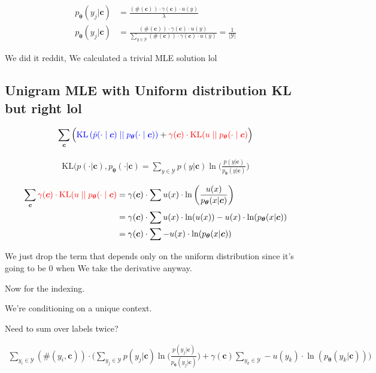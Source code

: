 \documentclass{article}
\newcommand{\KL}{\mathrm{KL}}
\newcommand{\uniform}{u}
\newcommand{\vtheta}{\boldsymbol{\theta}}
\newcommand{\model}{p_{\vtheta}}
\newcommand{\context}{\boldsymbol{c}}
\begin{document}
			\begin{align}
				\model(y_j|\context)  &= \frac{(\#(\context))\cdot \gamma(\context)\cdot u(y)}{\lambda}\\
				\model(y_j|\context)  &= \frac{(\#(\context))\cdot \gamma(\context)\cdot u(y)}{\sum_{y\in\mathcal{Y}} (\#(\context))\cdot \gamma(\context)\cdot u(y)} = \frac{1}{|\mathcal{Y}|}
			\end{align}
			
			We did it reddit, We calculated a trivial MLE solution lol
			
	\subsection{Unigram MLE with Uniform distribution KL but right lol}
	
		\begin{align}
	  		\sum_{\context} \Big( {\color{blue} \KL\left(\tilde{p}(\cdot 			\mid \context) \mid\mid \model(\cdot \mid \context)					\right)} + {\color{red}\gamma(\context) \cdot 						\KL(\uniform \mid\mid \model(\cdot \mid \context)}\Big)
		\end{align}
		
		\begin{align}
			\KL(p(\cdot|\context), \model(\cdot|\context) = \sum_{y\in\mathcal{Y}} p(y|\context)\ln\bigg(\frac{p(y|\context)}{\model(y|\context)} \bigg)
		\end{align}
		
		\begin{align}
			\sum_{\context} {\color{red}\gamma(\context) \cdot 						\KL(\uniform \mid\mid \model(\cdot \mid \context)} &= \gamma(\context)\cdot\sum u(x)\cdot \ln\bigg(\frac{u(x)}{\model(x|\context)}\bigg)\\
		&= \gamma(\context)\cdot\sum u(x)\cdot\ln(u(x)) - u(x)\cdot\ln(\model(x|\context))\\
		&= \gamma(\context)\cdot\sum - u(x)\cdot\ln(\model(x|\context))
		\end{align}
		
		We just drop the term that depends only on the uniform distribution since it's going to be 0 when We take the derivative anyway.
		
		Now for the indexing. 
		
		We're conditioning on a unique context.
		
		Need to sum over labels twice?
		
		\begin{align}
			\sum_{y_i\in\mathcal{Y}} (\#(y_i, \context))\cdot \bigg( \sum_{y_j\in\mathcal{Y}} p(y_j|\context)\ln\bigg(\frac{p(y_j|\context)}{\model(y_j|\context)} \bigg) + \gamma(\context)\sum_{y_k\in\mathcal{Y}} - u(y_k)\cdot\ln(\model(y_k|\context)) \bigg)
		\end{align}	
		
\end{document}
